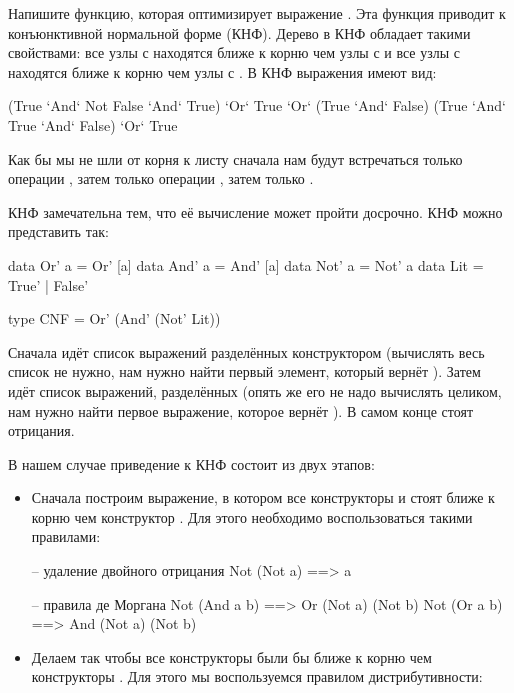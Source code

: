 \begin{itemize}
Напишите функцию, которая оптимизирует выражение
. Эта функция приводит  к 
конъюнктивной нормальной форме (КНФ). Дерево в КНФ
обладает такими свойствами: все узлы с  
находятся ближе к корню чем узлы с  и
все узлы с  находятся ближе к корню 
чем узлы с . В КНФ выражения имеют вид:

\begin{code}
(True `And` Not False `And` True) `Or` True `Or` (True `And` False)
(True `And` True `And` False) `Or` True
\end{code}

Как бы мы не шли от корня к листу сначала нам будут 
встречаться только операции , затем только 
операции , затем только .

КНФ замечательна тем, что её вычисление может
пройти досрочно. КНФ можно представить так:

\begin{code}
data Or'  a = Or'  [a]
data And' a = And' [a]
data Not' a = Not'  a
data Lit    = True' | False'

type CNF = Or' (And' (Not' Lit))
\end{code}

Сначала идёт список выражений разделённых 
конструктором  (вычислять весь список не нужно,
нам нужно найти первый элемент, который вернёт ).
Затем идёт список выражений, разделённых 
(опять же его не надо вычислять целиком, нам нужно найти
первое выражение, которое вернёт ). 
В самом конце стоят отрицания. 

В нашем случае приведение к КНФ состоит из двух этапов:


\begin{itemize}
\item Сначала построим выражение, в котором все
        конструкторы  и  стоят
        ближе к корню чем конструктор .
        Для этого необходимо воспользоваться такими
        правилами:

\begin{code}
-- удаление двойного отрицания
Not (Not a)  ==> a  

-- правила де Моргана
Not (And a b) ==> Or  (Not a) (Not b)
Not (Or  a b) ==> And (Not a) (Not b)

\end{code}

\item Делаем так чтобы все конструкторы  
были бы ближе к корню чем конструкторы .
Для этого мы воспользуемся правилом дистрибутивности:


\end{itemize}
\end{itemize}
